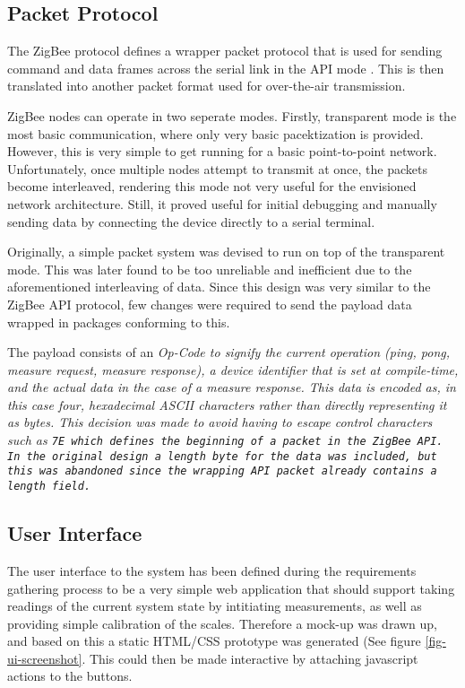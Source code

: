 \subsection{Packet Protocol}
The ZigBee protocol defines a wrapper packet protocol that is used for sending command and data frames across the serial link in the API mode \cite[page 35]{zigbee-datasheet}. This is then translated into another packet format used for over-the-air transmission.

ZigBee nodes can operate in two seperate modes. Firstly, transparent mode is the most basic communication, where only very basic pacektization is provided. However, this is very simple to get running for a basic point-to-point network. Unfortunately, once multiple nodes attempt to transmit at once, the packets become interleaved, rendering this mode not very useful for the envisioned network architecture. Still, it proved useful for initial debugging and manually sending data by connecting the device directly to a serial terminal.

Originally, a simple packet system was devised to run on top of the transparent mode. This was later found to be too unreliable and inefficient due to the aforementioned interleaving of data. Since this design was very similar to the ZigBee API protocol, few changes were required to send the payload data wrapped in packages conforming to this.

The payload consists of an \em{Op-Code} to signify the current operation (ping, pong, measure request, measure response), a \em{device identifier} that is set at compile-time, and the actual data in the case of a measure response. This data is encoded as, in this case four, hexadecimal ASCII characters rather than directly representing it as bytes. This decision was made to avoid having to escape control characters such as \tt{7E} which defines the beginning of a packet in the ZigBee API. In the original design a length byte for the data was included, but this was abandoned since the wrapping API packet already contains a length field.

\subsection{User Interface}
The user interface to the system has been defined during the requirements gathering process to be a very simple web application that should support taking readings of the current system state by intitiating measurements, as well as providing simple calibration of the scales. Therefore a mock-up was drawn up, and based on this a static HTML/CSS prototype was generated (See figure \ref{fig-ui-screenshot}. This could then be made interactive by attaching javascript actions to the buttons.

